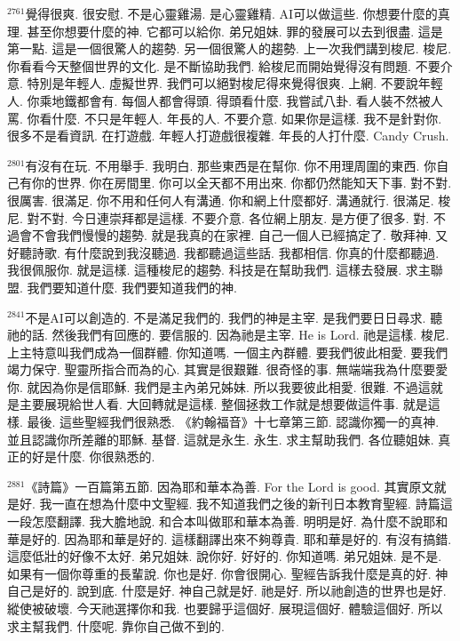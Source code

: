 \documentclass{book}
\begin{document}
$^{2761}$覺得很爽.
很安慰.
不是心靈雞湯.
是心靈雞精.
AI可以做這些.
你想要什麼的真理.
甚至你想要什麼的神.
它都可以給你.
弟兄姐妹.
罪的發展可以去到很盡.
這是第一點.
這是一個很驚人的趨勢.
另一個很驚人的趨勢.
上一次我們講到梭尼.
梭尼.
你看看今天整個世界的文化.
是不斷協助我們.
給梭尼而開始覺得沒有問題.
不要介意.
特別是年輕人.
虛擬世界.
我們可以絕對梭尼得來覺得很爽.
上網.
不要說年輕人.
你乘地鐵都會有.
每個人都會得頭.
得頭看什麼.
我嘗試八卦.
看人裝不然被人罵.
你看什麼.
不只是年輕人.
年長的人.
不要介意.
如果你是這樣.
我不是針對你.
很多不是看資訊.
在打遊戲.
年輕人打遊戲很複雜.
年長的人打什麼.
Candy Crush.

$^{2801}$有沒有在玩.
不用舉手.
我明白.
那些東西是在幫你.
你不用理周圍的東西.
你自己有你的世界.
你在房間里.
你可以全天都不用出來.
你都仍然能知天下事.
對不對.
很厲害.
很滿足.
你不用和任何人有溝通.
你和網上什麼都好.
溝通就行.
很滿足.
梭尼.
對不對.
今日連崇拜都是這樣.
不要介意.
各位網上朋友.
是方便了很多.
對.
不過會不會我們慢慢的趨勢.
就是我真的在家裡.
自己一個人已經搞定了.
敬拜神.
又好聽詩歌.
有什麼說到我沒聽過.
我都聽過這些話.
我都相信.
你真的什麼都聽過.
我很佩服你.
就是這樣.
這種梭尼的趨勢.
科技是在幫助我們.
這樣去發展.
求主聯盟.
我們要知道什麼.
我們要知道我們的神.

$^{2841}$不是AI可以創造的.
不是滿足我們的.
我們的神是主宰.
是我們要日日尋求.
聽祂的話.
然後我們有回應的.
要信服的.
因為祂是主宰.
He is Lord.
祂是這樣.
梭尼.
上主特意叫我們成為一個群體.
你知道嗎.
一個主內群體.
要我們彼此相愛.
要我們竭力保守.
聖靈所指合而為的心.
其實是很艱難.
很奇怪的事.
無端端我為什麼要愛你.
就因為你是信耶穌.
我們是主內弟兄姊妹.
所以我要彼此相愛.
很難.
不過這就是主要展現給世人看.
大回轉就是這樣.
整個拯救工作就是想要做這件事.
就是這樣.
最後.
這些聖經我們很熟悉.
《約翰福音》十七章第三節.
認識你獨一的真神.
並且認識你所差離的耶穌.
基督.
這就是永生.
永生.
求主幫助我們.
各位聽姐妹.
真正的好是什麼.
你很熟悉的.

$^{2881}$《詩篇》一百篇第五節.
因為耶和華本為善.
For the Lord is good.
其實原文就是好.
我一直在想為什麼中文聖經.
我不知道我們之後的新刊日本教育聖經.
詩篇這一段怎麼翻譯.
我大膽地說.
和合本叫做耶和華本為善.
明明是好.
為什麼不說耶和華是好的.
因為耶和華是好的.
這樣翻譯出來不夠尊貴.
耶和華是好的.
有沒有搞錯.
這麼低壯的好像不太好.
弟兄姐妹.
說你好.
好好的.
你知道嗎.
弟兄姐妹.
是不是.
如果有一個你尊重的長輩說.
你也是好.
你會很開心.
聖經告訴我什麼是真的好.
神自己是好的.
說到底.
什麼是好.
神自己就是好.
祂是好.
所以祂創造的世界也是好.
縱使被破壞.
今天祂選擇你和我.
也要歸乎這個好.
展現這個好.
體驗這個好.
所以求主幫我們.
什麼呢.
靠你自己做不到的.
\end{document}
